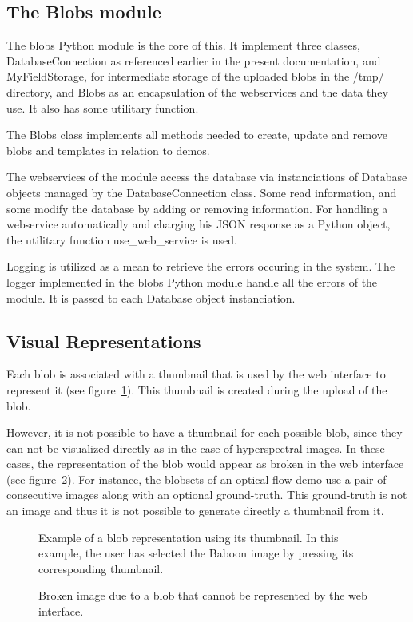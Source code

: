 \subsection{The Blobs module}
The blobs Python module is the core of this. It implement three classes, DatabaseConnection as referenced earlier in the present documentation, and MyFieldStorage, for intermediate storage of the uploaded blobs in the /tmp/ directory, and Blobs as an encapsulation of the webservices and the data they use. It also has some utilitary function.

The Blobs class implements all methods needed to create, update and remove blobs and templates in relation to demos.

The webservices of the module access the database via instanciations of Database objects managed by the DatabaseConnection class. Some read information, and some modify the database by adding or removing information. For handling a webservice automatically and charging his JSON response as a Python object, the utilitary function use\_web\_service is used.

Logging is utilized as a mean to retrieve the errors occuring in the system. The logger implemented in the blobs Python module handle all the errors of the module. It is passed to each Database object instanciation.

\subsection{Visual Representations}
Each blob is associated with a thumbnail that is used by the web interface to represent it (see figure~\ref{fig:blob_thumbnail_example}). This thumbnail is created during the upload of the blob.  

However, it is not possible to have a thumbnail for each possible blob, since they can not be visualized directly as in the case of hyperspectral images. In these cases, the representation of the blob would appear as broken in the web interface (see figure~\ref{fig:broken_representation}). For instance, the blobsets of an optical flow demo use a pair of consecutive images along with an optional ground-truth. This ground-truth is not an image and thus it is not possible to generate directly a thumbnail from it.
%

\begin{figure}[h]
\centering
{}
\caption{Example of a blob representation using its thumbnail. In this example, the user has selected the Baboon image by pressing its corresponding thumbnail.} 
\label{fig:blob_thumbnail_example}
\end{figure}
%
\begin{figure}[h]
\centering
{}
\caption{Broken image due to a blob that cannot be represented by the web interface.} 
\label{fig:broken_representation}
\end{figure}

